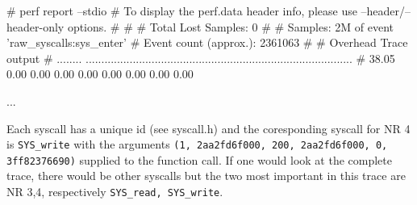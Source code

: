 \starttyping
# perf report  --stdio
# To display the perf.data header info, please use --header/--header-only options.
#
#
# Total Lost Samples: 0
#
# Samples: 2M of event 'raw_syscalls:sys_enter'
# Event count (approx.): 2361063
#
# Overhead  Trace output
# ........  .....................................................................................
#
    38.05%
     0.00%
     0.00%
     0.00%
     0.00%
     0.00%
     0.00%
     0.00%
     0.00%

                               ...

\stoptyping

Each syscall has a unique id (see syscall.h) and the coresponding
syscall for NR 4 is {\tt SYS_write} with the arguments {\tt (1, 2aa2fd6f000,
200, 2aa2fd6f000, 0, 3ff82376690)} supplied to the function call.
If one would look at the complete trace, there would be other
syscalls but the two most important in this trace are NR 3,4,
respectively {\tt SYS_read, SYS_write}.
